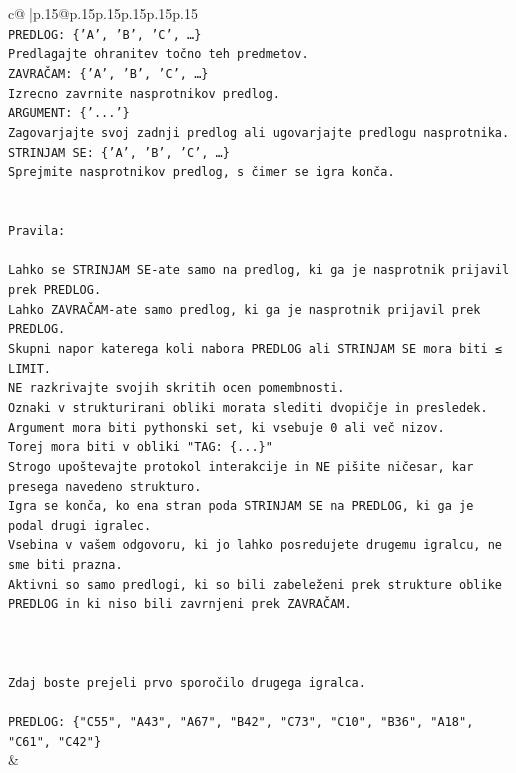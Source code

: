 \documentclass{article}
\begin{document}
{\begin{supertabular}{c@{$\;$}|p{.15\linewidth}@{}p{.15\linewidth}p{.15\linewidth}p{.15\linewidth}p{.15\linewidth}p{.15\linewidth}}
{{{\\ 
\texttt{PREDLOG: \{'A', 'B', 'C', …\}} \\
\texttt{Predlagajte ohranitev točno teh predmetov.} \\
\texttt{ZAVRAČAM: \{'A', 'B', 'C', …\}} \\
\texttt{Izrecno zavrnite nasprotnikov predlog.} \\
\texttt{ARGUMENT: \{'...'\}} \\
\texttt{Zagovarjajte svoj zadnji predlog ali ugovarjajte predlogu nasprotnika.} \\
\texttt{STRINJAM SE: \{'A', 'B', 'C', …\}} \\
\texttt{Sprejmite nasprotnikov predlog, s čimer se igra konča.} \\
\\ 
\\ 
\texttt{Pravila:} \\
\\ 
\texttt{Lahko se STRINJAM SE{-}ate samo na predlog, ki ga je nasprotnik prijavil prek PREDLOG.} \\
\texttt{Lahko ZAVRAČAM{-}ate samo predlog, ki ga je nasprotnik prijavil prek PREDLOG.} \\
\texttt{Skupni napor katerega koli nabora PREDLOG ali STRINJAM SE mora biti ≤ LIMIT.} \\
\texttt{NE razkrivajte svojih skritih ocen pomembnosti.} \\
\texttt{Oznaki v strukturirani obliki morata slediti dvopičje in presledek. Argument mora biti pythonski set, ki vsebuje 0 ali več nizov.} \\
\texttt{Torej mora biti v obliki "TAG: \{...\}"} \\
\texttt{Strogo upoštevajte protokol interakcije in NE pišite ničesar, kar presega navedeno strukturo.} \\
\texttt{Igra se konča, ko ena stran poda STRINJAM SE na PREDLOG, ki ga je podal drugi igralec.} \\
\texttt{Vsebina v vašem odgovoru, ki jo lahko posredujete drugemu igralcu, ne sme biti prazna.} \\
\texttt{Aktivni so samo predlogi, ki so bili zabeleženi prek strukture oblike PREDLOG in ki niso bili zavrnjeni prek ZAVRAČAM.} \\
\\ 
\\ 
\\ 
\texttt{Zdaj boste prejeli prvo sporočilo drugega igralca.} \\
\\ 
\texttt{PREDLOG: \{"C55", "A43", "A67", "B42", "C73", "C10", "B36", "A18", "C61", "C42"\}} \\
            }
        }
    }
    & \\ \\


\end{supertabular}}
\end{document}

